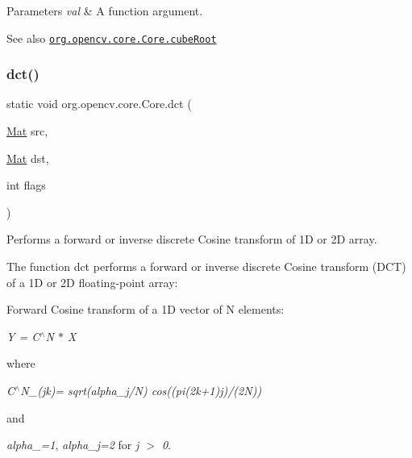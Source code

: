 \begin{DoxyParams}{Parameters}
{\em val} & A function argument.\\
\hline
\end{DoxyParams}
\begin{DoxySeeAlso}{See also}
\href{http://docs.opencv.org/modules/core/doc/utility_and_system_functions_and_macros.html#cuberoot}{\tt org.\+opencv.\+core.\+Core.\+cube\+Root} 
\end{DoxySeeAlso}
\mbox{\label{classorg_1_1opencv_1_1core_1_1_core_a1f0b3c28295d4db1ecd755201833d6cb}} 
\subsubsection{\texorpdfstring{dct()}{dct()}\hspace{0.1cm}{\footnotesize\ttfamily [1/2]}}
{\footnotesize\ttfamily static void org.\+opencv.\+core.\+Core.\+dct (\begin{DoxyParamCaption}\item[{\mbox{\hyperlink{classorg_1_1opencv_1_1core_1_1_mat}{Mat}}}]{src,  }\item[{\mbox{\hyperlink{classorg_1_1opencv_1_1core_1_1_mat}{Mat}}}]{dst,  }\item[{int}]{flags }\end{DoxyParamCaption})\hspace{0.3cm}{\ttfamily [static]}}

Performs a forward or inverse discrete Cosine transform of 1D or 2D array.

The function {\ttfamily dct} performs a forward or inverse discrete Cosine transform (D\+CT) of a 1D or 2D floating-\/point array\+:


\begin{DoxyItemize}
\item Forward Cosine transform of a 1D vector of {\ttfamily N} elements\+: 
\end{DoxyItemize}

{\itshape Y = C$^\wedge$N $\ast$ X}

where

{\itshape C$^\wedge$\+N\+\_\+(jk)= sqrt(alpha\+\_\+j/N) cos((pi(2k+1)j)/(2N))}

and

{\itshape alpha\+\_=1}, {\itshape alpha\+\_\+j=2} for {\itshape j $>$ 0}.


